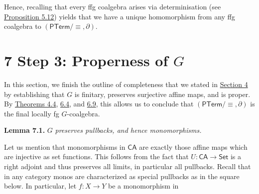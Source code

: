 \documentclass[11pt,a4paper]{amsart}
\begin{document}
\par\medskip
\hypertarget{html:S6.SSx1.p6}{} Hence, recalling that every ffg coalgebra arises via determinisation (see \hyperlink{html:S5.Thmtheorem12}{Proposition 5.12}) yields that we have a unique homomorphism from any ffg coalgebra to %
\hypertarget{html:S6.SSx1.p6.m1}{}\({(\mathsf{PTerm}/{\equiv},\partial)}\).
\par\medskip
   
%
\hypertarget{html:S7}{} %
\hypertarget{html:S7.m1}{}\section*{7 Step 3: Properness of \({G}\)}
\hypertarget{html:S7.p1}{} In this section, we finish the outline of completeness that we stated in \hyperlink{html:S4}{Section 4} by establishing that %
\hypertarget{html:S7.p1.m1}{}\({G}\) is finitary, preserves surjective affine maps, and is proper. By \hyperlink{html:S4.Thmtheorem4}{Theorems 4.4}, \hyperlink{html:S6.Thmtheorem4}{6.4}, and \hyperlink{html:S6.Thmtheorem9}{6.9}, this allows us to conclude that %
\hypertarget{html:S7.p1.m2}{}\({(\mathsf{PTerm}/{\equiv},\partial)}\) is the final locally fg %
\hypertarget{html:S7.p1.m3}{}\({G}\)-coalgebra.
\par\medskip
\hypertarget{html:S7.Thmtheorem1}{} \par\noindent\textbf{\textbf{Lemma 7.1}\textbf{.}}\quad  %
\hypertarget{html:S7.Thmtheorem1.p1}{} %
\hypertarget{html:S7.Thmtheorem1.p1.m1}{}\({G}\)\emph{ preserves pullbacks, and hence monomorphisms.}
\par\medskip
\hypertarget{html:S7.p2}{} Let us mention that monomorphisms in %
\hypertarget{html:S7.p2.m1}{}\({\mathsf{CA}}\) are exactly those affine maps which are injective as set functions. This follows from the fact that %
\hypertarget{html:S7.p2.m2}{}\({U\colon\mathsf{CA}\to\mathsf{Set}}\) is a right adjoint and thus preserves all limits, in particular all pullbacks. Recall that in any category monos are characterized as special pullbacks as in the square below. In particular, let %
\hypertarget{html:S7.p2.m3}{}\({f:X\to Y}\) be a monomorphism in %
\end{document}
